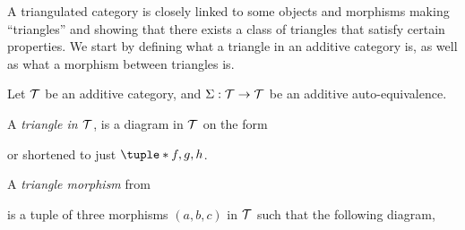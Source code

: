 A triangulated category is closely linked to some objects and morphisms making ``triangles'' and showing that there exists a class of triangles that satisfy certain properties. We start by defining what a triangle in an additive category is, as well as what a morphism between triangles is.

\begin{definition}[Triangles]
    \label{def:triangles}
    Let \( {\mathcal{T}} \) be an additive category, and \( \Sigma: {\mathcal{T}} \to {\mathcal{T}} \) be an additive auto-equivalence.

    A \emph{triangle in \( {\mathcal{T}} \)}, is a diagram in \( {\mathcal{T}} \) on the form
    \begin{center}
    \end{center}
    or shortened to just \( \tuple*{f, g, h} \).

    A \emph{triangle morphism} from
    \begin{center}
    \end{center}
    is a tuple of three morphisms \( (a, b, c) \) in \( {\mathcal{T}} \) such that the following diagram,
    \begin{center}
\end{center}
\end{definition}
